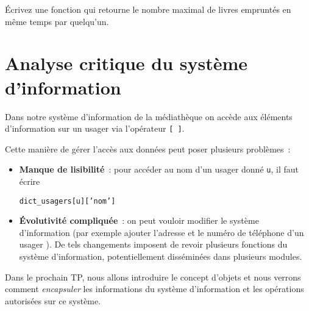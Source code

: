 \documentclass[10pt,a4paper]{sujets-exercices}
\begin{document}

Écrivez une fonction qui retourne le nombre maximal de livres empruntés en même temps par quelqu'un.


\section{Analyse critique du système d'information}

Dans notre système d'information de la médiathèque on accède aux éléments d'information sur un usager via l'opérateur \verb![ ]!. 

Cette manière de gérer l'accès aux données peut poser plusieurs problèmes~:

\begin{itemize}
\item \textbf{Manque de lisibilité}~: pour accéder au nom d'un usager donné \texttt{u}, il faut écrire 
\begin{center}

	\texttt{dict\_usagers[u]['nom']}
\end{center}
\item \textbf{Évolutivité compliquée}~: on peut vouloir modifier le système d'information (par exemple ajouter l'adresse et le numéro de téléphone d'un usager ). De tels changements imposent de revoir plusieurs fonctions du système d'information, potentiellement disséminées dans plusieurs modules.
\end{itemize}

Dans le prochain TP, nous allons introduire le concept d'objets et nous verrons comment \emph{encapsuler} les informations du système d'information et les opérations autorisées sur ce système.
\end{document}
